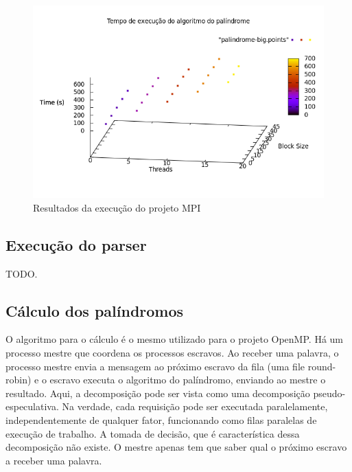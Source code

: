 \documentclass[a4paper]{article}
\begin{document}
\begin{figure}[float=p]
	\includegraphics[scale=0.5]{graph-mpi}
	\caption{Resultados da execução do projeto MPI}
	\label{graph-mpi}
\end{figure}

\subsection{Execução do parser}
\indent \indent TODO.

\subsection{Cálculo dos palíndromos}
\indent \indent O algoritmo para o cálculo é o mesmo utilizado para o projeto OpenMP. Há um processo mestre que coordena os processos escravos. Ao receber uma palavra, o processo mestre envia a mensagem ao próximo escravo da fila (uma file round-robin) e o escravo executa o algoritmo do palíndromo, enviando ao mestre o resultado. Aqui, a decomposição pode ser vista como uma decomposição pseudo-especulativa. Na verdade, cada requisição pode ser executada paralelamente, independentemente de qualquer fator, funcionando como filas paralelas de execução de trabalho. A tomada de decisão, que é característica dessa decomposição não existe. O mestre apenas tem que saber qual o próximo escravo a receber uma palavra.
\end{document}
